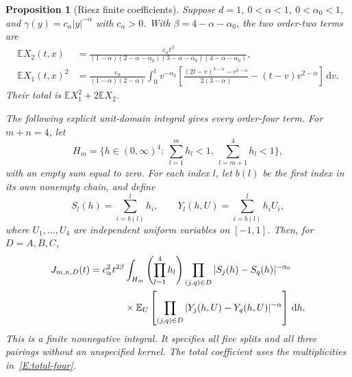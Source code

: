 \documentclass[12pt,oneside,openany]{book}
\makeatletter
\let\lean@pending\@empty
\newcommand{\LeanMarker}[1]{\gdef\lean@pending{#1}}
\numberwithin{equation}{section}
\newtheorem{proposition}[theorem]{Proposition}
\theoremstyle{nogostyle}
\theoremstyle{definition}
\newcommand{\E}{\mathbb{E}}
\newcommand{\ud}{\,\mathrm{d}}
\makeatother
\begin{document}
\LeanMarker{P:riesz-small}
\begin{proposition}[Riesz finite coefficients]\label{P:riesz-small}
  Suppose $d = 1$, $0 < \alpha < 1$, $0 < \alpha_0 < 1$, and $\gamma(y) =
  c_\alpha|y|^{-\alpha}$ with $c_\alpha > 0$. With $\beta = 4-\alpha-\alpha_0$,
  the two order-two terms are
  \begin{equation}\label{E:riesz-two}
    \begin{split}
      \E X_2(t,x)
      &=\frac{c_\alpha t^\beta}
      {(1-\alpha)(2-\alpha-\alpha_0)(3-\alpha-\alpha_0)
      (4-\alpha-\alpha_0)},\\
      \E X_1(t,x)^2
      &=\frac{c_\alpha}{(1-\alpha)(2-\alpha)}
      \int_0^t v^{-\alpha_0}
      \left[\frac{(2t-v)^{3-\alpha}-v^{3-\alpha}}{2(3-\alpha)}
      -(t-v)v^{2-\alpha}\right]\ud v.
    \end{split}
  \end{equation}
  Their total is $\E X_1^2+2\E X_2$.

  The following explicit unit-domain integral gives every order-four term. For
  $m+n = 4$, let
  \[
    H_m=\{h\in(0,\infty)^4:\ \sum_{l=1}^m h_l<1,
    \ \sum_{l=m+1}^4 h_l<1\},
  \]
  with an empty sum equal to zero. For each index $l$, let $b(l)$ be the first
  index in its own nonempty chain, and define
  \[
    S_l(h)=\sum_{i=b(l)}^l h_i,\qquad
    Y_l(h,U)=\sum_{i=b(l)}^l h_iU_i,
  \]
  where $U_1,\ldots,U_4$ are independent uniform variables on $[-1,1]$. Then,
  for $D = A,B,C$,
  \begin{equation}\label{E:riesz-four}
    \begin{split}
      J_{m,n,D}(t)
      ={}&c_\alpha^2t^{2\beta}
      \int_{H_m}\left(\prod_{l=1}^4h_l\right)
      \prod_{(j,q)\in D}|S_j(h)-S_q(h)|^{-\alpha_0}\\
      &\hspace{8mm}\times
      \E_U\left[\prod_{(j,q)\in D}
      |Y_j(h,U)-Y_q(h,U)|^{-\alpha}\right]\ud h.
    \end{split}
  \end{equation}
  This is a finite nonnegative integral. It specifies all five splits and all
  three pairings without an unspecified kernel. The total coefficient uses the
  multiplicities in~\eqref{E:total-four}.
\end{proposition}
\end{document}

